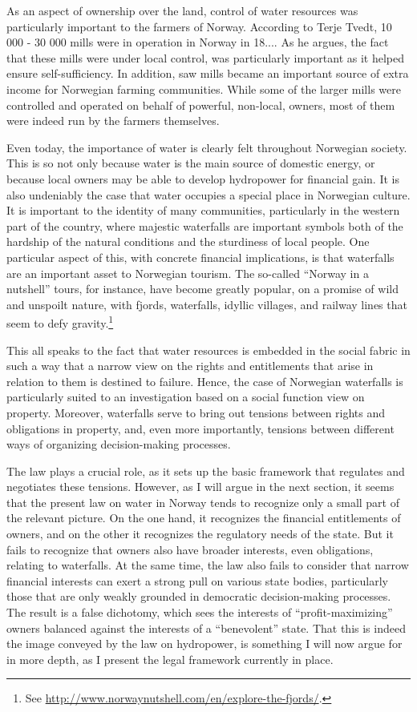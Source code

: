 As an aspect of ownership over the land, control of water resources was particularly important to the farmers of Norway. According to Terje Tvedt, 10 000 - 30 000 mills were in operation in Norway in 18....  As he argues, the fact that these mills were under local control, was particularly important as it helped ensure self-sufficiency. In addition, saw mills became an important source of extra income for Norwegian farming communities. While some of the larger mills were controlled and operated on behalf of powerful, non-local, owners, most of them were indeed run by the farmers themselves.

Even today, the importance of water is clearly felt throughout Norwegian society. This is so not only because water is the main source of domestic energy, or because local owners may be able to develop hydropower for financial gain. It is also undeniably the case that water occupies a special place in Norwegian culture. It is important to the identity of many communities, particularly in the western part of the country, where majestic waterfalls are important symbols both of the hardship of the natural conditions and the sturdiness of local people. One particular aspect of this, with concrete financial implications, is that waterfalls are an important asset to Norwegian tourism. The so-called ``Norway in a nutshell'' tours, for instance, have become greatly popular, on a promise of wild and unspoilt nature, with fjords, waterfalls, idyllic villages, and railway lines that seem to defy gravity.\footnote{See \url{http://www.norwaynutshell.com/en/explore-the-fjords/}.}

This all speaks to the fact that water resources is embedded in the social fabric in such a way that a narrow view on the rights and entitlements that arise in relation to them is destined to failure. Hence, the case of Norwegian waterfalls is particularly suited to an investigation based on a social function view on property. Moreover, waterfalls serve to bring out tensions between rights and obligations in property, and, even more importantly, tensions between different ways of organizing decision-making processes. 

The law plays a crucial role, as it sets up the basic framework that regulates and negotiates these tensions. However, as I will argue in the next section, it seems that the present law on water in Norway tends to recognize only a small part of the relevant picture. On the one hand, it recognizes the financial entitlements of owners, and on the other it recognizes the regulatory needs of the state. But it fails to recognize that owners also have broader interests, even obligations, relating to waterfalls. At the same time, the law also fails to consider that narrow financial interests can exert a strong pull on various state bodies, particularly those that are only weakly grounded in democratic decision-making processes. The result is a false dichotomy, which sees the interests of ``profit-maximizing'' owners balanced against the interests of a ``benevolent'' state. That this is indeed the image conveyed by the law on hydropower, is something I will now argue for in more depth, as I present the legal framework currently in place. 

